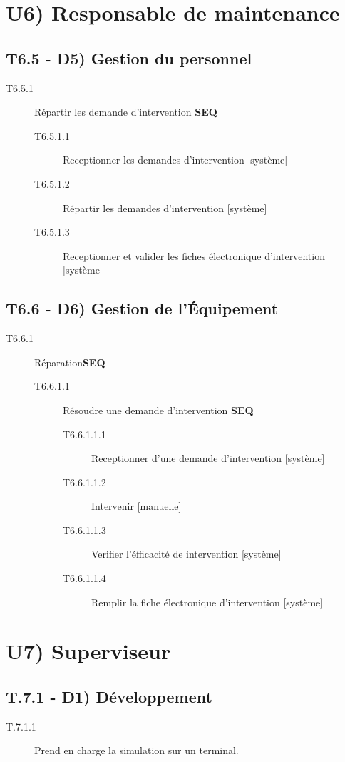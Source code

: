 \section*{U6) Responsable de maintenance}
	\subsection*{T6.5 - D5) Gestion du personnel}
	\begin{description}
		\item[T6.5.1] Répartir les demande d'intervention \textbf{SEQ}
		\begin{description}
			\item[T6.5.1.1] Receptionner les demandes d'intervention [système]
			\item[T6.5.1.2] Répartir les demandes d'intervention [système]
			\item[T6.5.1.3] Receptionner et valider les fiches électronique d'intervention [système]
		\end{description}
	\end{description}
	
	\subsection*{T6.6 - D6) Gestion de l'Équipement}
	\begin{description}
		\item[T6.6.1] Réparation\textbf{SEQ}
		\begin{description}
			\item[T6.6.1.1] Résoudre une demande d'intervention \textbf{SEQ}
			\begin{description}
				\item[T6.6.1.1.1] Receptionner d'une demande d'intervention [système]
				\item[T6.6.1.1.2] Intervenir [manuelle]
				\item[T6.6.1.1.3] Verifier l'éfficacité de intervention [système]
				\item[T6.6.1.1.4] Remplir la fiche électronique d'intervention [système]
			\end{description}
		\end{description}
	\end{description}

\section*{U7) Superviseur}
	\subsection*{T.7.1 - D1) Développement}
	\begin{description}
		\item[T.7.1.1] Prend en charge la simulation sur un terminal.
	\end{description}

